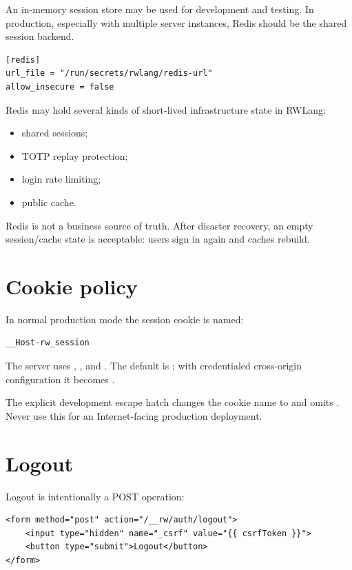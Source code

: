 An in-memory session store may be used for development and testing. In production, especially with multiple server instances, Redis should be the shared session backend.

\begin{lstlisting}
[redis]
url_file = "/run/secrets/rwlang/redis-url"
allow_insecure = false
\end{lstlisting}

Redis may hold several kinds of short-lived infrastructure state in RWLang:

\begin{itemize}
  \item shared sessions;
  \item TOTP replay protection;
  \item login rate limiting;
  \item public cache.
\end{itemize}

Redis is not a business source of truth. After disaster recovery, an empty session/cache state is acceptable: users sign in again and caches rebuild.

\section{Cookie policy}

In normal production mode the session cookie is named:

\begin{lstlisting}
__Host-rw_session
\end{lstlisting}

The server uses , , and . The default is ; with credentialed cross-origin configuration it becomes .

The explicit development escape hatch  changes the cookie name to  and omits . Never use this for an Internet-facing production deployment.

\section{Logout}

Logout is intentionally a POST operation:

\begin{lstlisting}[language=RWLang]
<form method="post" action="/__rw/auth/logout">
    <input type="hidden" name="_csrf" value="{{ csrfToken }}">
    <button type="submit">Logout</button>
</form>
\end{lstlisting}

